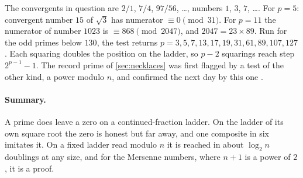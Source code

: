 The convergents in question are $2/1$, $7/4$, $97/56$, \ldots, numbers $1$, $3$, $7$, \ldots. For
$p=5$: convergent number $15$ of $\sqrt3$ has numerator $\equiv0\pmod{31}$. For $p=11$ the numerator of
number $1023$ is $\equiv868\pmod{2047}$, and $2047=23\times89$. Run for the odd primes below $130$, the
test returns $p=3,5,7,13,17,19,31,61,89,107,127$. Each squaring doubles the position on the ladder, so
$p-2$ squarings reach step $2^{p-1}-1$. The record prime of \cref{sec:necklaces} was first flagged by a test of
the other kind, a power modulo $n$, and confirmed the next day by this one \citep{GIMPS2024}.

\paragraph{Summary.} A prime does leave a zero on a continued-fraction ladder. On the ladder of its own
square root the zero is honest but far away, and one composite in six imitates it. On a fixed ladder
read modulo $n$ it is reached in about $\log_2 n$ doublings at any size, and for the Mersenne numbers,
where $n+1$ is a power of $2$, it is a proof.
